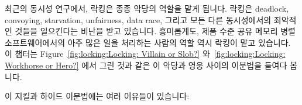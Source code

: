 
%

최근의 동시성 연구에서, 락킹은 종종 악당의 역할을 맡게 됩니다.
락킹은 deadlock, convoying, starvation, unfairness, data race, 그리고 모든 다른
동시성에서의 죄악적인 것들을 일으킨다는 비난을 받고 있습니다.
흥미롭게도, 제품 수준 공유 메모리 병렬 소프트웨어에서의 아주 많은 일을 처리하는
사람의 역할 역시 락킹이 맡고 있습니다.
이 챕터는
Figure~\ref{fig:locking:Locking: Villain or Slob?}
와~\ref{fig:locking:Locking: Workhorse or Hero?}
에서 그린 것과 같은 이 악당과 영웅 사이의 이분법을 들여다 봅니다.

이 지킬과 하이드 이분법에는 여러 이유들이 있습니다:


